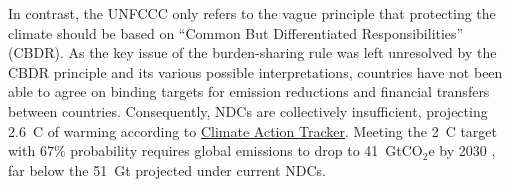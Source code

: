 \documentclass[12pt,english]{article}
\begin{document}
In contrast, the UNFCCC only refers to the vague principle that protecting the climate should be based on ``Common But Differentiated Responsibilities'' (CBDR). As the key issue of the burden-sharing rule was left unresolved by the CBDR principle and its various possible interpretations, countries have not been able to agree on binding targets for emission reductions and financial transfers between countries. Consequently, NDCs are collectively insufficient, projecting 2.6~\textdegree{}C of warming according to \href{https://climateactiontracker.org/}{Climate Action Tracker}. Meeting the 2~\textdegree{}C target with 67\% probability requires global emissions to drop to 41~GtCO$_\text{2}$e by 2030 \citep{den_elzen_updated_2022}, far below the 51~Gt projected under current NDCs.


\end{document}
